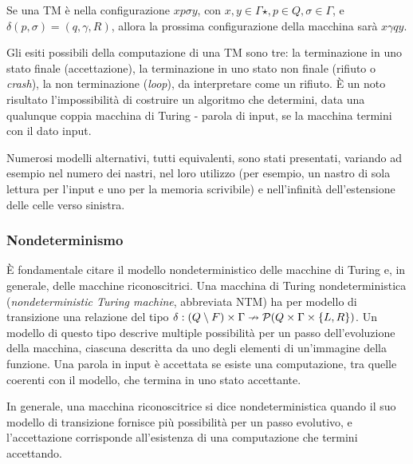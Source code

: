 \begin{examp}
	Se una TM è nella configurazione $xp\sigma y$, con $x,y\in\Gamma\star, p\in Q,\sigma\in\Gamma$, e $\delta(p,\sigma)=(q,\gamma,R)$, allora la prossima configurazione della macchina sarà $x\gamma qy$.
\end{examp}

Gli esiti possibili della computazione di una TM sono tre: la terminazione in uno stato finale (accettazione), la terminazione in uno stato non finale (rifiuto o \emph{crash}), la non terminazione (\emph{loop}), da interpretare come un rifiuto. È un noto risultato l'impossibilità di costruire un algoritmo che determini, data una qualunque coppia macchina di Turing - parola di input, se la macchina termini con il dato input.

Numerosi modelli alternativi, tutti equivalenti, sono stati presentati, variando ad esempio nel numero dei nastri, nel loro utilizzo (per esempio, un nastro di sola lettura per l'input e uno per la memoria scrivibile) e nell'infinità dell'estensione delle celle verso sinistra.

\subsubsection{Nondeterminismo}
È fondamentale citare il modello nondeterministico delle macchine di Turing e, in generale, delle macchine riconoscitrici. Una macchina di Turing nondeterministica (\emph{nondeterministic Turing machine}, abbreviata NTM) ha per modello di transizione una relazione del tipo $\delta:(Q\setminus F)\times\Gamma\nrightarrow \mathcal P(Q\times\Gamma\times\left\{ L,R \right\})$. Un modello di questo tipo descrive multiple possibilità per un passo dell'evoluzione della macchina, ciascuna descritta da uno degli elementi di un'immagine della funzione. Una parola in input è accettata se esiste una computazione, tra quelle coerenti con il modello, che termina in uno stato accettante.

In generale, una macchina riconoscitrice si dice nondeterministica quando il suo modello di transizione fornisce più possibilità per un passo evolutivo, e l'accettazione corrisponde all'esistenza di una computazione che termini accettando.

